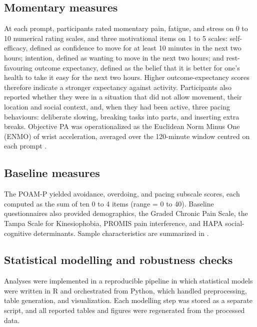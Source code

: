 \documentclass[11pt,a4paper]{article}
\begin{document}
\subsection{Momentary measures}
At each prompt, participants rated momentary pain, fatigue, and stress on 0 to 10 numerical
rating scales, and three motivational items on 1 to 5 scales: self-efficacy, defined as
confidence to move for at least 10 minutes in the next two hours; intention, defined as
wanting to move in the next two hours; and rest-favouring outcome expectancy, defined as the
belief that it is better for one's health to take it easy for the next two hours. Higher
outcome-expectancy scores therefore indicate a stronger expectancy against activity.
Participants also reported whether they were in a situation that did not allow movement,
their location and social context, and, when they had been active, three pacing behaviours:
deliberate slowing, breaking tasks into parts, and inserting extra breaks. Objective PA was
operationalized as the Euclidean Norm Minus One (ENMO) of wrist acceleration, averaged over
the 120-minute window centred on each prompt
\citep{vanhees2013separating,migueles2019ggir}.

\subsection{Baseline measures}
The POAM-P yielded avoidance, overdoing, and pacing subscale scores, each computed as the sum
of ten 0 to 4 items (range = 0 to 40). Baseline questionnaires also provided demographics,
the Graded Chronic Pain Scale, the Tampa Scale for Kinesiophobia, PROMIS pain interference,
and HAPA social-cognitive determinants. Sample characteristics are summarized in
.



\subsection{Statistical modelling and robustness checks}
Analyses were implemented in a reproducible pipeline in which statistical models were
written in \textsf{R} \citep{rcoreteam2024} and orchestrated from \textsf{Python}, which
handled preprocessing, table generation, and visualization. Each modelling step was stored
as a separate script, and all reported tables and figures were regenerated from the
processed data.
\end{document}
